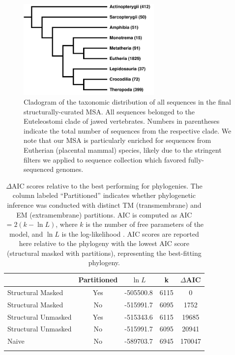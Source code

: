 \documentclass[fleqn,10pt]{wlpeerj}
\begin{document}
\newpage


\begin{figure}[htbp]
	\centerline{\includegraphics[width=7cm]{figures/taxonomic_distribution.pdf}}
	\caption{\label{taxa_dist} Cladogram of the taxonomic distribution of all sequences in the final structurally-curated MSA. All sequences belonged to the Euteleostomi clade of jawed vertebrates. Numbers in parentheses indicate the total number of sequences from the respective clade. We note that our MSA is particularly enriched for sequences from Eutherian (placental mammal) species, likely due to the stringent filters we applied to sequence collection which favored fully-sequenced genomes.}
\end{figure}

\vspace{3cm}

\begin{table}[htbp]
	\centering
	\begin{tabular}{l c l l c}
		\hline\noalign{\smallskip}
		\multicolumn{1}{c}{MSA} & \multicolumn{1}{c}{Partitioned} & \multicolumn{1}{c}{$\ln L$} & \multicolumn{1}{c}{k} & \multicolumn{1}{l}{$\Delta$AIC} \\
		\hline\noalign{\smallskip}
		Structural Masked & Yes & -505500.8 & 6115 & 0 \\
		Structural Masked & No & -515991.7 & 6095 & 1752 \\  
		Structural Unmasked & Yes & -515343.6 & 6115 & 19685 \\
		Structural Unmasked & No & -515991.7 & 6095 & 20941 \\ 
		Naive & No &  -589703.7 & 6945 & 170047 \\
		\noalign{\smallskip}\hline\noalign{\smallskip} 
	\end{tabular}
	\caption{\label{tab:phylo_AIC} $\Delta$AIC scores relative to the best performing for phylogenies. The column labeled ``Partitioned'' indicates whether phylogenetic inference was conducted with distinct TM (transmembrane) and EM (extramembrane) partitions. AIC is computed as AIC $= 2(k - \ln L)$, where $k$ is the number of free parameters of the model, and $\ln L$ is the log-likelihood \citep{Akaike1974,BurnhamAnderson2004}. AIC scores are reported here relative to the phylogeny with the lowest AIC score (structural masked with partitions), representing the best-fitting phylogeny.}
\end{table}
\end{document}

